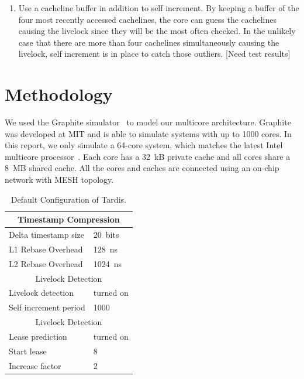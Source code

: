 \documentclass[12pt]{article}
\begin{document}
\begin{enumerate}
	\item       Use a cacheline buffer in addition to self increment. By keeping a buffer of the four most recently accessed cachelines, the core can guess the cachelines causing the livelock since they will be the most often checked. In the unlikely case that there are more than four cachelines simultaneously causing the livelock, self increment is in place to catch those outliers.
	[Need test results]
\end{enumerate}

\section{Methodology}

We used the Graphite simulator~\cite{graphite} to model our multicore 
architecture. Graphite was developed at MIT and is able to simulate 
systems with up to 1000 cores. In this report, we only simulate a 
64-core system, which matches the latest Intel multicore 
processor~\cite{xeonphi}. Each core has a 32~kB private cache and all 
cores share a 8~MB shared cache. All the cores and caches are 
connected using an on-chip network with MESH topology.

\begin{table}
	\caption{ Default Configuration of Tardis. }
	\begin{center}
	{ 
		\begin{tabular}{|l|l|}
            \hline
			\multicolumn{2}{|c|}{Timestamp Compression} \\
			\hline
			Delta timestamp size 		& 20~bits \\
			L1 Rebase Overhead 			& 128~ns\\
			L2 Rebase Overhead			& 1024~ns \\
			\hline
			\multicolumn{2}{|c|}{Livelock Detection} \\
			\hline
			Livelock detection 			& turned on \\
			Self increment period 		& 1000 \\
			\hline
			\multicolumn{2}{|c|}{Livelock Detection} \\
			\hline
			Lease prediction			& turned on \\
			Start lease 				& 8 \\
			Increase factor				& 2 \\
			\hline
		\end{tabular}
    }
	\end{center}
    \label{tab:system}
	\vspace{-.2in}
\end{table}
\end{document}
